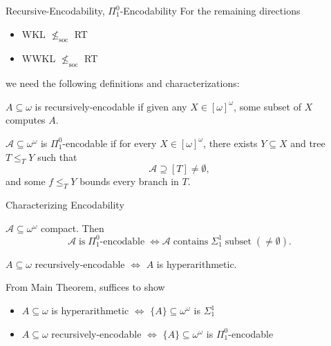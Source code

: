 \begin{frame}{Recursive-Encodability, $\Pi_1^0$-Encodability}
  For the remaining directions
  \begin{itemize}
    \item WKL $\nleq_{\text{soc}}$ RT
    \item WWKL $\nleq_{\text{soc}}$ RT
  \end{itemize}
  we need the following definitions and characterizations:

  \begin{define}
    $A\subseteq\omega$ is recursively-encodable if given any
    $X\in[\omega]^\omega$, some subset of $X$ computes $A$.
  \end{define}

  \begin{define}
    $\mathcal{A}\subseteq \omega^{\omega}$ is $\Pi_1^0$-encodable if for
    every $X\in[\omega]^\omega$, there exists $Y\subseteq X$ and tree
    $T\leq_T Y$ such that
    \[\mathcal{A} \supseteq [T]\neq\emptyset,\]
    and some $f\leq_T Y$ bounds every branch in $T$.
  \end{define}
\end{frame}

\begin{frame}{Characterizing Encodability}
  \begin{main-thm*}
    $\mathcal{A}\subseteq \omega^{\omega}$ compact. Then
    \[\mathcal{A}\; \text{is}\; \Pi_1^0\text{-encodable}\; \Leftrightarrow
    \mathcal{A}\; \text{contains}\; \Sigma_1^1\; \text{subset}\;
    (\neq\emptyset).\]
  \end{main-thm*}

  \begin{coro*}
    $A\subseteq\omega$ recursively-encodable $\Leftrightarrow$ $A$ is
    hyperarithmetic.
  \end{coro*}

  \vspace{1em}
  From Main Theorem, suffices to show
  \begin{itemize}
    \item $A\subseteq\omega$ is hyperarithmetic $\Leftrightarrow$
      $\{A\}\subseteq\omega^\omega$ is $\Sigma_1^1$
    \item $A\subseteq\omega$ recursively-encodable $\Leftrightarrow$
      $\{A\}\subseteq\omega^\omega$ is $\Pi_1^0$-encodable
  \end{itemize}
\end{frame}

